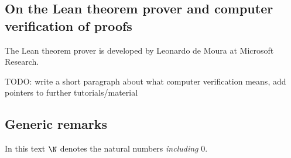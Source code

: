 \subsection{On the Lean theorem prover and computer verification of proofs}
\label{on-lean}

The Lean theorem prover is developed by Leonardo de Moura
at Microsoft Research.

TODO: write a short paragraph about what computer verification means,
add pointers to further tutorials/material

\subsection{Generic remarks}

\begin{remark}
  In this text $\N$ denotes the natural numbers \emph{including} $0$.
\end{remark}

